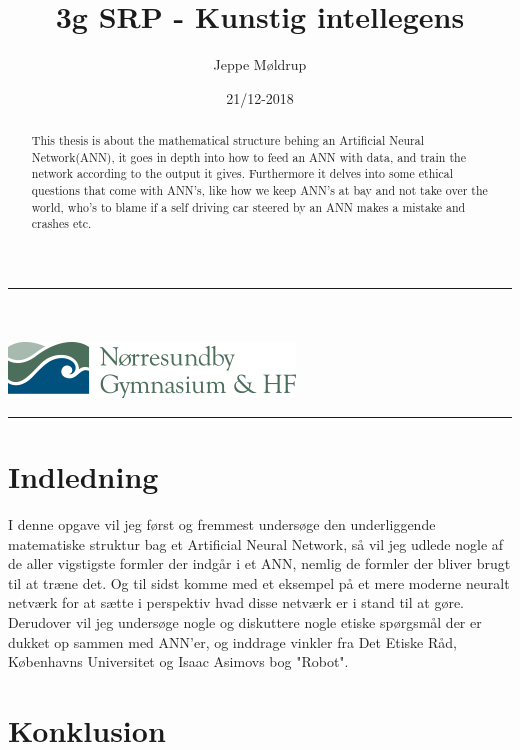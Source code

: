 \documentclass[12pt]{article}
\title{3g SRP - Kunstig intellegens}
\author{Jeppe Møldrup}
\affil{Nørresundby gymnasium og HF}
\date{21/12-2018}
\begin{document}
\begin{titlingpage}
\clearpage\maketitle
\thispagestyle{empty}
\noindent\rule{\textwidth}{0.4pt}\\
\\
\includegraphics[width=\textwidth]{pic/logo.png}
\noindent\rule{\textwidth}{0.4pt}
\pagebreak

\begin{abstract}
        This thesis is about the mathematical structure behing an Artificial Neural Network(ANN), it goes in depth into how to
        feed an ANN with data, and train the network according to the output it gives. Furthermore it delves into some
        ethical questions that come with ANN's, like how we keep ANN's at bay and not take over the world, who's to blame
        if a self driving car steered by an ANN makes a mistake and crashes etc.
\end{abstract}

\end{titlingpage}
\pagebreak

\tableofcontents
\pagebreak

\section{Indledning}

I denne opgave vil jeg først og fremmest undersøge den underliggende matematiske struktur bag et Artificial Neural Network, så vil jeg udlede
nogle af de aller vigstigste formler der indgår i et ANN, nemlig de formler der bliver brugt til at træne det. Og til sidst komme med et eksempel
på et mere moderne neuralt netværk for at sætte i perspektiv hvad disse netværk er i stand til at gøre. Derudover vil jeg undersøge nogle
og diskuttere nogle etiske spørgsmål der er dukket op sammen med ANN'er, og inddrage vinkler fra Det Etiske Råd, Københavns Universitet og Isaac Asimovs bog
"Robot".




\section{Konklusion}
\end{document}
